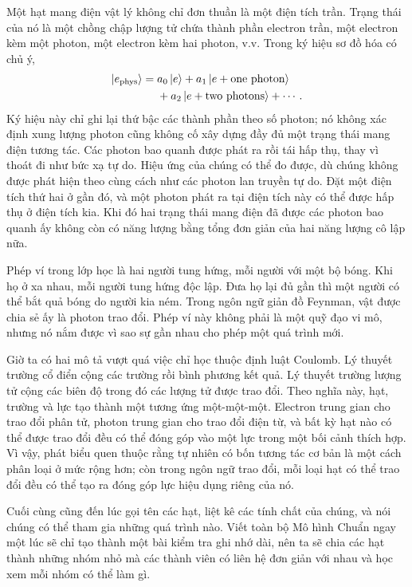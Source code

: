 Một hạt mang điện vật lý không chỉ đơn thuần là một điện tích trần. Trạng thái của nó là một chồng chập lượng tử chứa thành phần electron trần, một electron kèm một photon, một electron kèm hai photon, v.v. Trong ký hiệu sơ đồ hóa có chủ ý,
\begin{equation}
\begin{aligned}
\left\lvert e_{\mathrm{phys}}\right\rangle
={}&a_0\left\lvert e\right\rangle
+a_1\left\lvert e+\text{one photon}\right\rangle
\\
&+a_2\left\lvert e+\text{two photons}\right\rangle+\cdots .
\end{aligned}
\end{equation}
Ký hiệu này chỉ ghi lại thứ bậc các thành phần theo số photon; nó không xác định xung lượng photon cũng không cố xây dựng đầy đủ một trạng thái mang điện tương tác.
Các photon bao quanh được phát ra rồi tái hấp thụ, thay vì thoát đi như bức xạ tự do. Hiệu ứng của chúng có thể đo được, dù chúng không được phát hiện theo cùng cách như các photon lan truyền tự do. Đặt một điện tích thứ hai ở gần đó, và một photon phát ra tại điện tích này có thể được hấp thụ ở điện tích kia. Khi đó hai trạng thái mang điện đã được các photon bao quanh ấy không còn có năng lượng bằng tổng đơn giản của hai năng lượng cô lập nữa.

Phép ví trong lớp học là hai người tung hứng, mỗi người với một bộ bóng. Khi họ ở xa nhau, mỗi người tung hứng độc lập. Đưa họ lại đủ gần thì một người có thể bắt quả bóng do người kia ném. Trong ngôn ngữ giản đồ Feynman, vật được chia sẻ ấy là photon trao đổi. Phép ví này không phải là một quỹ đạo vi mô, nhưng nó nắm được vì sao sự gần nhau cho phép một quá trình mới.

Giờ ta có hai mô tả vượt quá việc chỉ học thuộc định luật Coulomb. Lý thuyết trường cổ điển cộng các trường rồi bình phương kết quả. Lý thuyết trường lượng tử cộng các biên độ trong đó các lượng tử được trao đổi. Theo nghĩa này, hạt, trường và lực tạo thành một tương ứng một-một-một. Electron trung gian cho trao đổi phân tử, photon trung gian cho trao đổi điện từ, và bất kỳ hạt nào có thể được trao đổi đều có thể đóng góp vào một lực trong một bối cảnh thích hợp. Vì vậy, phát biểu quen thuộc rằng tự nhiên có bốn tương tác cơ bản là một cách phân loại ở mức rộng hơn; còn trong ngôn ngữ trao đổi, mỗi loại hạt có thể trao đổi đều có thể tạo ra đóng góp lực hiệu dụng riêng của nó.

Cuối cùng cũng đến lúc gọi tên các hạt, liệt kê các tính chất của chúng, và nói chúng có thể tham gia những quá trình nào. Viết toàn bộ Mô hình Chuẩn ngay một lúc sẽ chỉ tạo thành một bài kiểm tra ghi nhớ dài, nên ta sẽ chia các hạt thành những nhóm nhỏ mà các thành viên có liên hệ đơn giản với nhau và học xem mỗi nhóm có thể làm gì.

